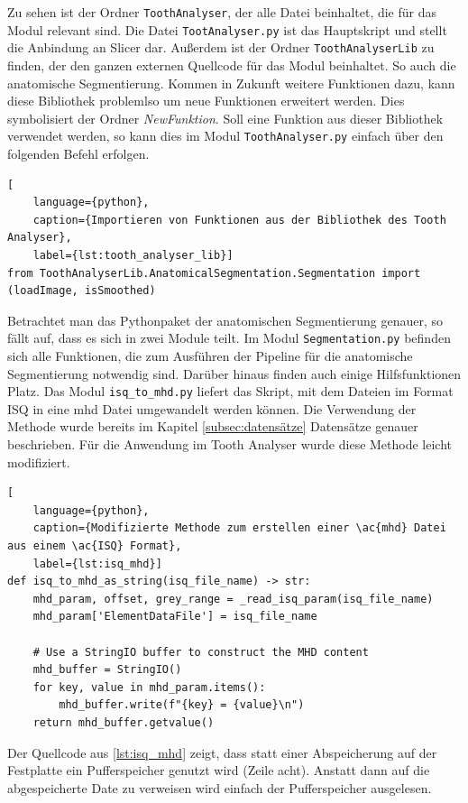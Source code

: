 Zu sehen ist der Ordner \texttt{ToothAnalyser}, der alle Datei beinhaltet, die
für das Modul relevant sind. Die Datei \texttt{TootAnalyser.py} ist das
Hauptskript und stellt die Anbindung an Slicer dar. Außerdem ist der Ordner \texttt{ToothAnalyserLib}
zu finden, der den ganzen externen Quellcode für das Modul beinhaltet. So auch
die anatomische Segmentierung. Kommen in Zukunft weitere Funktionen dazu, kann
diese Bibliothek problemlso um neue Funktionen erweitert werden. Dies symbolisiert
der Ordner \textsl{NewFunktion}. Soll eine Funktion aus dieser Bibliothek verwendet
werden, so kann dies im Modul \texttt{ToothAnalyser.py} einfach über den folgenden
Befehl erfolgen.

\begin{lstlisting}[
    language={python},
    caption={Importieren von Funktionen aus der Bibliothek des Tooth Analyser},
    label={lst:tooth_analyser_lib}]
from ToothAnalyserLib.AnatomicalSegmentation.Segmentation import (loadImage, isSmoothed)
\end{lstlisting}

Betrachtet man das Pythonpaket der anatomischen Segmentierung genauer, so fällt auf,
dass es sich in zwei Module teilt. Im Modul \texttt{Segmentation.py} befinden
sich alle Funktionen, die zum Ausführen der Pipeline für die anatomische Segmentierung
notwendig sind. Darüber hinaus finden auch einige Hilfsfunktionen Platz. Das Modul
\texttt{isq\_to\_mhd.py} liefert das Skript, mit dem Dateien im Format \ac{ISQ}
in eine \ac{mhd} Datei umgewandelt werden können. Die Verwendung der Methode
wurde bereits im Kapitel \ref{subsec:datensätze} Datensätze genauer beschrieben.
Für die Anwendung im Tooth Analyser wurde diese Methode leicht modifiziert.

\begin{lstlisting}[
    language={python},
    caption={Modifizierte Methode zum erstellen einer \ac{mhd} Datei aus einem \ac{ISQ} Format},
    label={lst:isq_mhd}]
def isq_to_mhd_as_string(isq_file_name) -> str:
    mhd_param, offset, grey_range = _read_isq_param(isq_file_name)
    mhd_param['ElementDataFile'] = isq_file_name

    # Use a StringIO buffer to construct the MHD content
    mhd_buffer = StringIO()
    for key, value in mhd_param.items():
        mhd_buffer.write(f"{key} = {value}\n")
    return mhd_buffer.getvalue()
\end{lstlisting}

Der Quellcode aus \ref{lst:isq_mhd} zeigt, dass statt einer Abspeicherung auf der
Festplatte ein Pufferspeicher genutzt wird (Zeile acht). Anstatt dann auf die
abgespeicherte Date zu verweisen wird einfach der Pufferspeicher ausgelesen.

